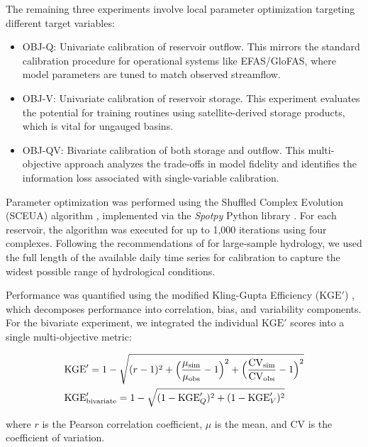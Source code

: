 \documentclass[hess, manuscript]{copernicus}
\newcommand{\calV}{OBJ-V}
\newcommand{\calQ}{OBJ-Q}
\newcommand{\calQV}{OBJ-QV}
\begin{document}
The remaining three experiments involve local parameter optimization targeting different target variables:
\begin{itemize} 
    \item \calQ: Univariate calibration of reservoir outflow. This mirrors the standard calibration procedure for operational systems like EFAS/GloFAS, where model parameters are tuned to match observed streamflow. 
    \item \calV: Univariate calibration of reservoir storage. This experiment evaluates the potential for training routines using satellite-derived storage products, which is vital for ungauged basins. 
    \item \calQV: Bivariate calibration of both storage and outflow. This multi-objective approach analyzes the trade-offs in model fidelity and identifies the information loss associated with single-variable calibration. 
\end{itemize}

Parameter optimization was performed using the Shuffled Complex Evolution (SCEUA) algorithm \citep{Duan1993, Duan1994}, implemented via the \textit{Spotpy} Python library \citep{Houska2015}. For each reservoir, the algorithm was executed for up to 1,000 iterations using four complexes. Following the recommendations of \citet{Shen2024} for large-sample hydrology, we used the full length of the available daily time series for calibration to capture the widest possible range of hydrological conditions.

Performance was quantified using the modified Kling-Gupta Efficiency ($\text{KGE}'$) \citep{kling2012}, which decomposes performance into correlation, bias, and variability components. For the bivariate experiment, we integrated the individual $\text{KGE}'$ scores into a single multi-objective metric:

{\small
\begin{subequations}
    \label{eq:metrics}
    \begin{align}
        &\text{KGE}' = 1 - \sqrt{(r - 1)^2 + \Bigl(\frac{\mu_{\text{sim}}}{\mu_{\text{obs}}} - 1\Bigr)^2 + \Bigl(\frac{\text{CV}_{\text{sim}}}{\text{CV}_{\text{obs}}} - 1\Bigr)^2} \label{eq:kge} \\
        &\text{KGE}'_{\text{bivariate}} = 1 - \sqrt{(1 - \text{KGE}'_Q)^2 + (1 - \text{KGE}'_V)^2} \label{eq:kge_bivariate}
    \end{align}
\end{subequations}
}

where $r$ is the Pearson correlation coefficient, $\mu$ is the mean, and $\text{CV}$ is the coefficient of variation.
\end{document}
